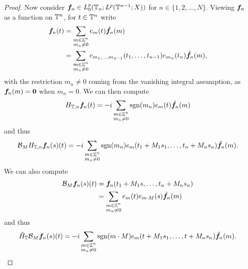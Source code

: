 \begin{proof}
  Now consider $\bm{f}_{n} \in L^{p}_{0}(\mathbb{T}_{n} ; L^p(\mathbb{T}^{n-1};X))$ for $n \in \{1,2,\ldots,N\}$.
  Viewing $\bm{f}_{n}$ as a function on $\mathbb{T}^{n}$, for $t \in \mathbb{T}^{n}$ write
  \begin{equation*}
    \begin{aligned}
      \bm{f}_{n}(t)
      &= \sum_{\substack{m \in \mathbb{Z}^{n} \\ m_{n} \neq 0}} e_{m}(t) \hat{\bm{f}_{n}}(m)  \\
      &= \sum_{\substack{m \in \mathbb{Z}^{n} \\ m_{n} \neq 0}} e_{m_1,\ldots,m_{n-1}}(t_{1},\ldots,t_{n-1}) e_{m_n}(t_n) \hat{\bm{f}_{n}}(m) ,
  \end{aligned}
  \end{equation*}
  with the restriction $m_{n} \neq 0$ coming from the vanishing integral assumption, as $\bm{f}_{n}(m) = \bm{0}$ when $m_{n} = 0$.
  We can then compute
  \begin{equation*}
    H_{\mathbb{T},n} \bm{f}_{n}(t) = -i \sum_{\substack{m \in \mathbb{Z}^{n} \\ m_{n} \neq 0}} \operatorname{sgn}(m_n) e_{m}(t) \hat{\bm{f}_{n}}(m) 
  \end{equation*}
  and thus
  \begin{equation}\label{eq:BH}
    \mathcal{B}_{M} H_{\mathbb{T},n} \bm{f}_{n}(s)(t) = -i \sum_{\substack{m \in \mathbb{Z}^{n} \\ m_{n} \neq 0}} \operatorname{sgn}(m_n) e_{m}(t_1 + M_1s_1,\ldots,t_n + M_n s_n) \hat{\bm{f}_{n}}(m) .
  \end{equation}
  We can also compute
  \begin{equation*}
    \begin{aligned}
      \mathcal{B}_{M} \bm{f}_{n}(s)(t)
      &= \bm{f}_{n}(t_1 + M_1 s, \ldots, t_n + M_n s_n) \\
      &= \sum_{\substack{m \in \mathbb{Z}^{n} \\ m_n \neq 0}} e_{m}(t) e_{m \cdot M}(s) \hat{\bm{f}_n}(m)
    \end{aligned}
  \end{equation*}
  and thus
  \begin{equation}\label{eq:HB}
    \tilde{H}_{\mathbb{T}} \mathcal{B}_{M} \bm{f}_{n}(s)(t) = -i \sum_{\substack{m \in \mathbb{Z}^{n} \\ m_n \neq 0}} \operatorname{sgn}(m \cdot M) e_{m}(t + M_1 s_1, \ldots, t + M_n s_n)  \hat{\bm{f}_n}(m).
  \end{equation}
  

\end{proof}
